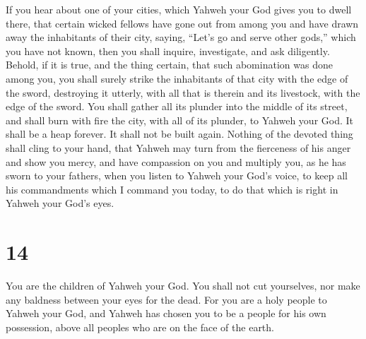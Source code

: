  If you hear about one of your cities, which Yahweh your
God gives you to dwell there, that  certain wicked fellows
have gone out from among you and have drawn away the inhabitants of
their city, saying, ``Let's go and serve other gods,'' which you have
not known,  then you shall inquire, investigate, and ask
diligently. Behold, if it is true, and the thing certain, that such
abomination was done among you,  you shall surely strike
the inhabitants of that city with the edge of the sword, destroying it
utterly, with all that is therein and its livestock, with the edge of
the sword.  You shall gather all its plunder into the
middle of its street, and shall burn with fire the city, with all of its
plunder, to Yahweh your God. It shall be a heap forever. It shall not be
built again.  Nothing of the devoted thing shall cling to
your hand, that Yahweh may turn from the fierceness of his anger and
show you mercy, and have compassion on you and multiply you, as he has
sworn to your fathers,  when you listen to Yahweh your
God's voice, to keep all his commandments which I command you today, to
do that which is right in Yahweh your God's eyes.

\hypertarget{section-13}{%
\section{14}\label{section-13}}

 You are the children of Yahweh your God. You shall not cut
yourselves, nor make any baldness between your eyes for the dead.
 For you are a holy people to Yahweh your God, and Yahweh
has chosen you to be a people for his own possession, above all peoples
who are on the face of the earth.

